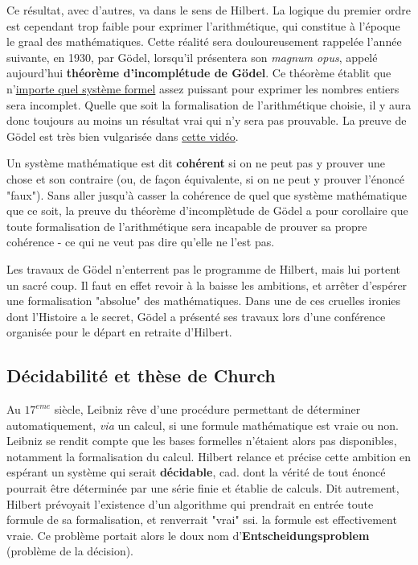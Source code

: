 Ce résultat, avec d'autres, va dans le sens de Hilbert. La logique du premier ordre est cependant trop faible pour exprimer l'arithmétique, qui constitue à l'époque le graal des mathématiques. Cette réalité sera douloureusement rappelée l'année suivante, en 1930, par Gödel, lorsqu'il présentera son \textit{magnum opus}, appelé aujourd'hui \textbf{théorème d'incomplétude de Gödel}. Ce théorème établit que n'\underline{importe quel système formel} assez puissant pour exprimer les nombres entiers sera incomplet. Quelle que soit la formalisation de l'arithmétique choisie, il y aura donc toujours au moins un résultat vrai qui n'y sera pas prouvable. La preuve de Gödel est très bien vulgarisée dans \href{https://www.youtube.com/watch?v=82jOF4Q6gBU}{cette vidéo}.

Un système mathématique est dit \textbf{cohérent} si on ne peut pas y prouver une chose et son contraire (ou, de façon équivalente, si on ne peut y prouver l'énoncé "faux"). Sans aller jusqu'à casser la cohérence de quel que système mathématique que ce soit, la preuve du théorème d'incomplètude de Gödel a pour corollaire que toute formalisation de l'arithmétique sera incapable de prouver sa propre cohérence - ce qui ne veut pas dire qu'elle ne l'est pas.

Les travaux de Gödel n'enterrent pas le programme de Hilbert, mais lui portent un sacré coup. Il faut en effet revoir à la baisse les ambitions, et arrêter d'espérer une formalisation "absolue" des mathématiques. Dans une de ces cruelles ironies dont l'Histoire a le secret, Gödel a présenté ses travaux lors d'une conférence organisée pour le départ en retraite d'Hilbert.

\subsection{Décidabilité et thèse de Church} 

Au $17^{eme}$ siècle, Leibniz rêve d'une procédure permettant de déterminer automatiquement, \textit{via} un calcul, si une formule mathématique est vraie ou non. Leibniz se rendit compte que les bases formelles n'étaient alors pas disponibles, notamment la formalisation du calcul. Hilbert relance et précise cette ambition en espérant un système qui serait \textbf{décidable}, cad. dont la vérité de tout énoncé pourrait être déterminée par une série finie et établie de calculs. Dit autrement, Hilbert prévoyait l'existence d'un algorithme qui prendrait en entrée toute formule de sa formalisation, et renverrait "vrai" ssi. la formule est effectivement vraie. Ce problème portait alors le doux nom d'\textbf{Entscheidungsproblem} (problème de la décision).

